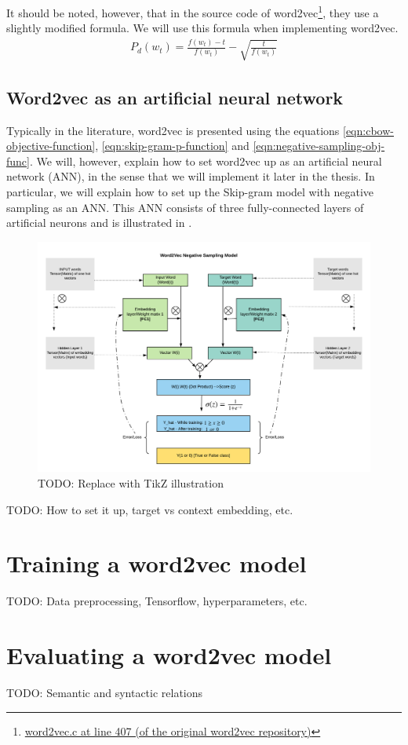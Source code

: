 \noindent
It should be noted, however, that in the source code of word2vec\footnote{\href{https://github.com/tmikolov/word2vec/blob/e092540633572b883e25b367938b0cca2cf3c0e7/word2vec.c\#L407}{word2vec.c at line 407 (of the original word2vec repository)}}, they use a slightly modified formula. We will use this formula when implementing word2vec.
\begin{align}
    P_d(w_t) = \frac{f(w_t) - t}{f(w_t)} - \sqrt{\frac{t}{f(w_t)}}
\end{align}

\subsection{Word2vec as an artificial neural network}
Typically in the literature, word2vec is presented using the equations \ref{eqn:cbow-objective-function}, \ref{eqn:skip-gram-p-function} and \ref{eqn:negative-sampling-obj-func}. We will, however, explain how to set word2vec up as an artificial neural network (ANN), in the sense that we will implement it later in the thesis. In particular, we will explain how to set up the Skip-gram model with negative sampling as an ANN. This ANN consists of three fully-connected layers of artificial neurons \cite{rong2014word2vec} and is illustrated in .

\begin{figure}[ht]
    \centering
    \includegraphics[width=12cm]{thesis/figures/word2vec-skip-gram-negative-sampling.png}
    \caption{TODO: Replace with TikZ illustration}
    \label{fig:word2vec-skip-gram-negative-sampling}
\end{figure}

\noindent
TODO: How to set it up, target vs context embedding, etc.

\section{Training a word2vec model}
TODO: Data preprocessing, Tensorflow, hyperparameters, etc.

\section{Evaluating a word2vec model}
TODO: Semantic and syntactic relations